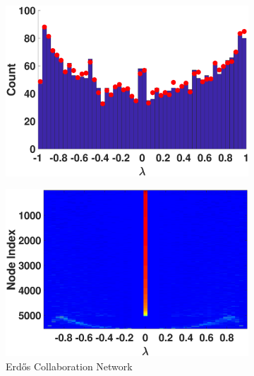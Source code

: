 \begin{figure}[ht]
\begin{subfigure}[t]{0.19\textwidth}
    \includegraphics[width=\textwidth,trim = .4cm 0.5cm 3.5cm 1.3cm,clip]
    {./ndos/pics/minnesota}
    \label{fig:minnesota_dos}
  \end{subfigure}
  \begin{subfigure}[t]{0.19\textwidth}
    \centering  
    \captionsetup{justification=centering,font=scriptsize}
    \includegraphics[width=\textwidth,trim = .4cm 0.5cm 3.5cm 1.3cm,clip]
    {./ndos/pics/erdos_ldos}
    \caption{Erd\H{o}s Collaboration Network}
    \label{fig:erdos_ldos}
  \end{subfigure}
  \begin{subfigure}[t]{0.19\textwidth}
    \centering  
    \captionsetup{justification=centering,font=scriptsize}

\end{subfigure}
\end{figure}

